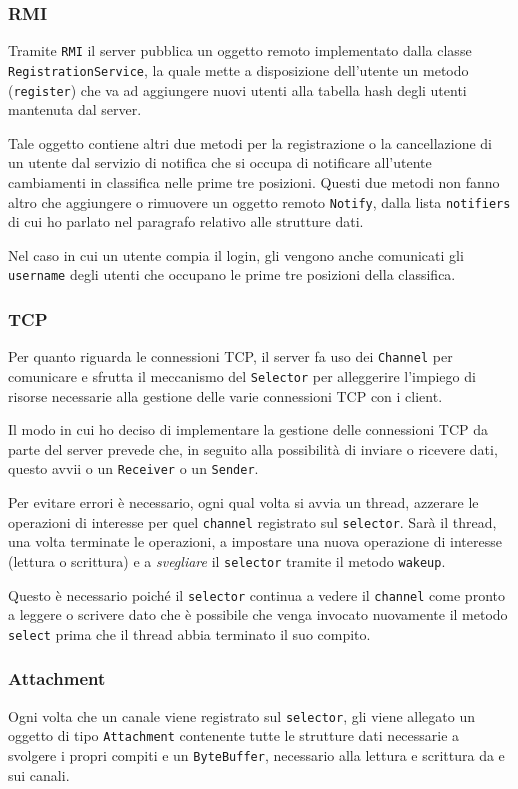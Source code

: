 \subsubsection{RMI}
Tramite \verb|RMI| il server pubblica un oggetto remoto implementato dalla classe
\verb|RegistrationService|, la quale mette a disposizione dell'utente un metodo (\verb|register|)
che va ad aggiungere nuovi utenti alla tabella hash degli utenti mantenuta dal server.

Tale oggetto contiene altri due metodi per la registrazione o la cancellazione di un utente dal
servizio di notifica che si occupa di notificare all'utente cambiamenti in classifica nelle prime
tre posizioni. Questi due metodi non fanno altro che aggiungere o rimuovere un oggetto remoto
\verb|Notify|, dalla lista \verb|notifiers| di cui ho parlato nel paragrafo relativo alle strutture
dati.

Nel caso in cui un utente compia il login, gli vengono anche comunicati gli \verb|username| degli
utenti che occupano le prime tre posizioni della classifica.

\subsubsection{TCP}
Per quanto riguarda le connessioni TCP, il server fa uso dei \verb|Channel| per comunicare e
sfrutta il meccanismo del \verb|Selector| per alleggerire l'impiego di risorse necessarie alla
gestione delle varie connessioni TCP con i client.

Il modo in cui ho deciso di implementare la gestione delle connessioni TCP da parte del server
prevede che, in seguito alla possibilità di inviare o ricevere dati, questo avvii o un
\verb|Receiver| o un \verb|Sender|.

Per evitare errori è necessario, ogni qual volta si avvia un thread, azzerare le operazioni di
interesse per quel \verb|channel| registrato sul \verb|selector|. Sarà il thread, una volta
terminate le operazioni, a impostare una nuova operazione di interesse (lettura o scrittura) e a
\emph{svegliare} il \verb|selector| tramite il metodo \verb|wakeup|.

Questo è necessario poiché il \verb|selector| continua a vedere il \verb|channel| come pronto a
leggere o scrivere dato che è possibile che venga invocato nuovamente il metodo \verb|select|
prima che il thread abbia terminato il suo compito.

\subsubsection{Attachment}
Ogni volta che un canale viene registrato sul \verb|selector|, gli viene allegato un oggetto di
tipo \verb|Attachment| contenente tutte le strutture dati necessarie a svolgere i propri compiti
e un \verb|ByteBuffer|, necessario alla lettura e scrittura da e sui canali.

